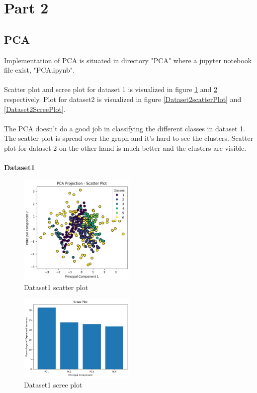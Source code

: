 \documentclass[12pt]{report}
\begin{document}
	\section*{Part 2}
	\subsection*{PCA}
	Implementation of PCA is situated in directory "PCA" where a jupyter notebook file exist, "PCA.ipynb". \\
	\\
	Scatter plot and scree plot for dataset 1 is visualized in figure \ref{Dataset1scatterPlot} and \ref{Dataset1ScreePlot} respectively. Plot for dataset2 is visualized
	in figure \ref{Dataset2scatterPlot} and \ref{Dataset2ScreePlot}.\\
	\\
	The PCA doesn't do a good job in classifying the different classes in dataset 1. The scatter plot is spread over the graph and it's hard to see the clusters. Scatter plot for dataset 2 on the other hand is much better and the clusters are visible.\\
	\\
	\textbf{Dataset1}\\
	\begin{figure}[H]
		\centering
		\includegraphics[width=0.5\textwidth]{../PCA/OutputPlot/Dataset1/Dataset1scatterPlot.png}
		\caption{Dataset1 scatter plot}
		\label{Dataset1scatterPlot}
	\end{figure}
	\begin{figure}[H]
		\centering
		\includegraphics[width=0.5\textwidth]{../PCA/OutputPlot/Dataset1/Dataset1ScreePlot.png}
		\caption{Dataset1 scree plot}
		\label{Dataset1ScreePlot}
	\end{figure}
\end{document}
